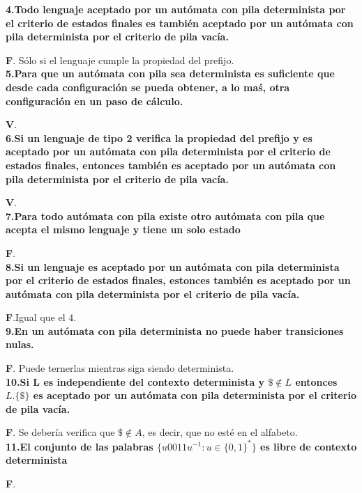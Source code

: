 \documentclass[a4paper,11pt]{article}
\begin{document}
\textbf{4.Todo lenguaje aceptado por un autómata con pila determinista por el criterio de estados finales es también aceptado por un autómata con pila determinista por el criterio de pila vacía.} 

\textbf{F}. Sólo si el lenguaje cumple la propiedad del prefijo. \\

\textbf{5.Para que un autómata con pila sea determinista es suficiente que desde cada configuración se pueda obtener, a lo maś, otra configuración en un paso de cálculo.}

\textbf{V}. \\

\textbf{6.Si un lenguaje de tipo 2 verifica la propiedad del prefijo y es aceptado por un autómata con pila determinista por el criterio de estados finales, entonces también es aceptado por un autómata con pila determinista por el criterio de pila vacía.}

\textbf{V}. \\

\textbf{7.Para todo autómata con pila existe otro autómata con pila que acepta el mismo lenguaje y tiene un solo estado}

\textbf{F}. \\

\textbf{8.Si un lenguaje es aceptado por un autómata con pila determinista por el criterio de estados finales, estonces también es aceptado por un autómata con pila determinista por el criterio de pila vacía.}

\textbf{F}.Igual que el 4. \\

\textbf{9.En un autómata con pila determinista no puede haber transiciones nulas.}

\textbf{F}. Puede ternerlas mientras siga siendo determinista. \\

\textbf{10.Si L es independiente del contexto determinista y $\$\notin L$ entonces $L.\{\$\}$ es aceptado por un autómata con pila determinista por el criterio de pila vacía.}

\textbf{F}. Se debería verifica que $\$ \notin A$, es decir, que no esté en el alfabeto. \\

\textbf{11.El conjunto de las palabras $\{u0011u^{-1}:u \in \{0,1\}^*\}$ es libre de contexto determinista}

\textbf{F}. \\
\end{document}
